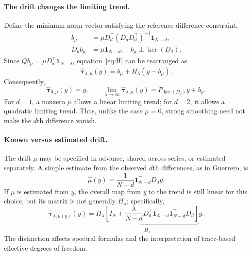 \documentclass[10pt,letterpaper]{article}
\begin{document}
\paragraph{The drift changes the limiting trend.}
Define the minimum-norm vector satisfying the reference-difference
constraint,
\begin{equation}\label{eq:bmu}
\begin{aligned}
 b_\mu&=\mu D_d^\top(D_dD_d^\top)^{-1}\bm{1}_{N-d},\\
 D_db_\mu&=\mu\bm{1}_{N-d},\quad b_\mu\perp\ker(D_d).
\end{aligned}
\end{equation}
Since $Qb_\mu=\mu D_d^\top\bm{1}_{N-d}$, equation~\eqref{eq:H}
can be rearranged as
\begin{equation}\label{eq:affine}
\widehat{\bm\tau}_{\lambda,\mu}(y)
 =b_\mu+H_\lambda(y-b_\mu).
\end{equation}
Consequently,
\begin{equation}\label{eq:limits}
\widehat{\bm\tau}_{0,\mu}(y)=y,\qquad
\lim_{\lambda\to\infty}\widehat{\bm\tau}_{\lambda,\mu}(y)
=P_{\ker(D_d)}y+b_\mu.
\end{equation}
For $d=1$, a nonzero $\mu$ allows a linear limiting trend; for
$d=2$, it allows a quadratic limiting trend. Thus, unlike the case
$\mu=0$, strong smoothing need not make the $d$th difference vanish.

\paragraph{Known versus estimated drift.}
The drift $\mu$ may be specified in advance, shared across series,
or estimated separately. A simple estimate from the observed
$d$th differences, as in Guerrero, is
\begin{equation}\label{eq:muhat}
 \widehat\mu(y)=\frac{1}{N-d}\bm{1}_{N-d}^\top D_dy.
\end{equation}
If $\mu$ is estimated from $y$, the overall map from $y$ to the trend
is still linear for this choice, but its matrix is not generally
$H_\lambda$; specifically,
\begin{equation}\label{eq:effective_H}
 \widehat{\bm\tau}_{\lambda,\widehat\mu(y)}(y)
 =\underbrace{H_\lambda\!\left[I_N+
 \frac{\lambda}{N-d}D_d^\top\bm{1}_{N-d}
 \bm{1}_{N-d}^\top D_d\right]}_{\widetilde H_\lambda}y.
\end{equation}
The distinction affects spectral formulas and the interpretation of
trace-based effective degrees of freedom.
\end{document}
